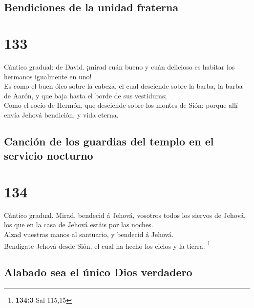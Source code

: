 \hypertarget{bendiciones-de-la-unidad-fraterna}{%
\subsection{Bendiciones de la unidad
fraterna}\label{bendiciones-de-la-unidad-fraterna}}

\hypertarget{section-132}{%
\section{133}\label{section-132}}

 Cántico gradual: de David. ¡mirad cuán bueno y cuán
delicioso es habitar los hermanos igualmente en uno!\\
 Es como el buen óleo sobre la cabeza, el cual desciende
sobre la barba, la barba de Aarón, y que baja hasta el borde de sus
vestiduras;\\
 Como el rocío de Hermón, que desciende sobre los montes
de Sión: porque allí envía Jehová bendición, y vida eterna.

\hypertarget{canciuxf3n-de-los-guardias-del-templo-en-el-servicio-nocturno}{%
\subsection{Canción de los guardias del templo en el servicio
nocturno}\label{canciuxf3n-de-los-guardias-del-templo-en-el-servicio-nocturno}}

\hypertarget{section-133}{%
\section{134}\label{section-133}}

 Cántico gradual. Mirad, bendecid á Jehová, vosotros todos
los siervos de Jehová, los que en la casa de Jehová estáis por las
noches.\\
 Alzad vuestras manos al santuario, y bendecid á Jehová.\\
 Bendígate Jehová desde Sión, el cual ha hecho los cielos
y la tierra. \footnote{\textbf{134:3} Sal 115,15}

\hypertarget{alabado-sea-el-uxfanico-dios-verdadero}{%
\subsection{Alabado sea el único Dios
verdadero}\label{alabado-sea-el-uxfanico-dios-verdadero}}

